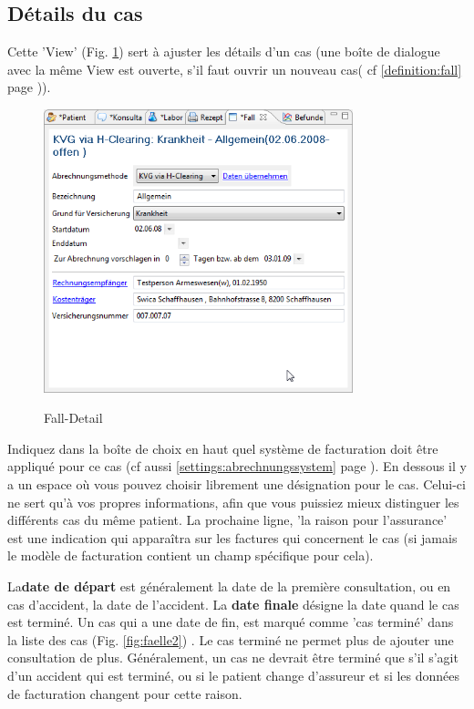 \subsection{Détails du cas}
\label{falldetail}
 Cette 'View' (Fig. \ref{fig:falldetail}) sert à ajuster les détails d'un cas (une boîte de dialogue avec la même View est ouverte, s'il faut ouvrir un nouveau cas( cf \ref{definition:fall} page \pageref{definition:fall})).
\begin{figure}[ht]
  \includegraphics[width=0.8\textwidth]{images/falldetail}\\
  \caption{Fall-Detail}\label{fig:falldetail}
\end{figure}
Indiquez dans la boîte de choix en haut quel système de facturation doit être appliqué pour ce cas (cf aussi \ref{settings:abrechnungssystem} page \pageref{settings:abrechnungssystem}). En dessous il y a un espace où vous pouvez choisir librement une désignation pour le cas. Celui-ci ne sert qu'à vos propres informations, afin que
 vous puissiez mieux distinguer les différents cas du même patient.
La prochaine ligne, 'la raison pour l'assurance' est une indication qui apparaîtra sur les factures qui concernent le cas (si jamais le modèle de facturation contient un champ spécifique pour cela).

La\textbf{date de départ } est généralement la date de la première consultation, ou en cas d'accident, la date de l'accident. La  \textbf{date finale } désigne la date quand le cas est terminé. Un cas qui a une date de fin, est marqué comme 'cas terminé' dans la liste des cas  (Fig. \ref{fig:faelle2}) . Le cas terminé ne permet plus de ajouter une consultation de plus. 
Généralement, un cas ne devrait être terminé que s'il s'agit d'un accident qui est terminé, ou si le patient change d'assureur et si les données de facturation changent pour cette raison.

